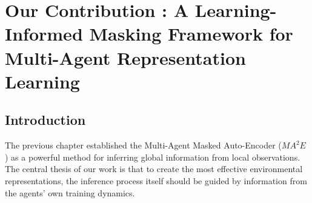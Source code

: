 \chapter{Our Contribution : A Learning-Informed Masking Framework for Multi-Agent Representation Learning}





\section*{Introduction }
The previous chapter established the Multi-Agent Masked Auto-Encoder (${MA}^2E$ ) \parencite{ma2e} as a powerful method for inferring global information from local observations. The central thesis of our work is that to create the most effective environmental representations, the inference process itself should be guided by information from the agents' own training dynamics.

